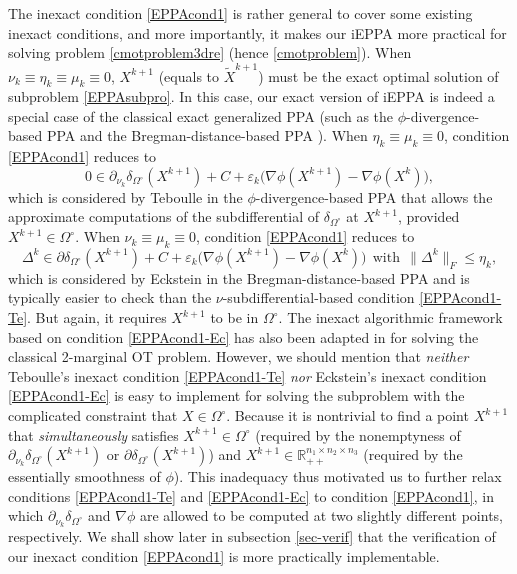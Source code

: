 \documentclass[10pt]{article}
\begin{document}
The inexact condition \eqref{EPPAcond1} is rather general to cover some existing inexact conditions, and more importantly, it makes our iEPPA more practical for solving problem \eqref{cmotproblem3dre} (hence \eqref{cmotproblem}). When $\nu_k\equiv\eta_k\equiv\mu_k\equiv0$, $X^{k+1}$ (equals to $\widetilde{X}^{k+1}$) must be the exact optimal solution of subproblem \eqref{EPPAsubpro}. In this case, our exact version of iEPPA is indeed a special case of the classical exact generalized PPA (such as the $\phi$-divergence-based PPA \cite{a1995interior,e1990multiplicative,ist1994entropy,i1995convergence,t1992entropic} and the Bregman-distance-based PPA
\cite{cz1992proximal,ct1993convergence,e1993nonlinear}). When $\eta_k\equiv\mu_k\equiv0$, condition \eqref{EPPAcond1} reduces to
\begin{equation}\label{EPPAcond1-Te}
0 \in \partial_{\nu_k} \delta_{\Omega^{\circ}}(X^{k+1}) + C + \varepsilon_k\big(\nabla\phi(X^{k+1}) - \nabla\phi(X^{k})\big),
\end{equation}
which is considered by Teboulle \cite{t1997convergence} in the $\phi$-divergence-based PPA that allows the approximate computations of the subdifferential of $\delta_{\Omega^{\circ}}$ at $X^{k+1}$, provided $X^{k+1}\in\Omega^\circ$. When $\nu_k\equiv\mu_k\equiv0$, condition \eqref{EPPAcond1} reduces to
\begin{equation}\label{EPPAcond1-Ec}
\Delta^{k} \in \partial\delta_{\Omega^{\circ}}(X^{k+1}) + C + \varepsilon_k\big(\nabla\phi(X^{k+1}) - \nabla\phi(X^{k})\big)
~~\mathrm{with}~~\|\Delta^{k}\|_F \leq \eta_k,
\end{equation}
which is considered by Eckstein \cite{e1998approximate} in the Bregman-distance-based PPA and is typically easier to check than the $\nu$-subdifferential-based condition \eqref{EPPAcond1-Te}. But again, it requires $X^{k+1}$ to be in $\Omega^\circ$. The inexact algorithmic framework based on condition \eqref{EPPAcond1-Ec} has also been adapted in \cite{xie2018fast} for solving the classical 2-marginal OT problem. However, we should mention that {\it neither} Teboulle's inexact condition \eqref{EPPAcond1-Te} {\it nor} Eckstein's inexact condition \eqref{EPPAcond1-Ec} is easy to implement for solving the subproblem with the complicated constraint that $X\in\Omega^{\circ}$. Because it is nontrivial to find a point $X^{k+1}$ that {\em simultaneously} satisfies $X^{k+1}\in\Omega^{\circ}$ (required by the nonemptyness of $\partial_{\nu_k} \delta_{\Omega^{\circ}}(X^{k+1})$ or $\partial \delta_{\Omega^{\circ}}(X^{k+1})$) and $X^{k+1}\in\mathbb{R}_{++}^{n_1 \times n_2 \times n_3}$ (required by the essentially smoothness of $\phi$). This inadequacy thus motivated us to further relax conditions \eqref{EPPAcond1-Te} and \eqref{EPPAcond1-Ec} to condition \eqref{EPPAcond1}, in which $\partial_{\nu_k} \delta_{\Omega^{\circ}}$ and $\nabla \phi$ are allowed to be computed at two slightly different points, respectively. We shall show later in subsection \ref{sec-verif} that the verification of our inexact condition \eqref{EPPAcond1} is more practically implementable.
\end{document}

